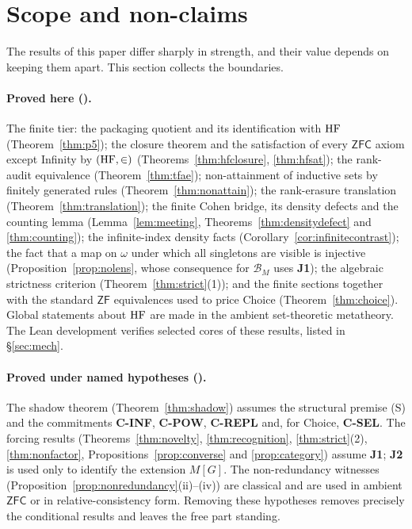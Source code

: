 \section{Scope and non-claims}\label{sec:scope}

The results of this paper differ sharply in strength, and their value depends on keeping them
apart. This section collects the boundaries.

\paragraph{Proved here (\inhouse).} The finite tier: the packaging quotient and its
identification with $\mathrm{HF}$ (Theorem~\ref{thm:p5}); the closure theorem and the satisfaction of
every $\mathsf{ZFC}$ axiom except Infinity by $(\mathrm{HF},\in)$ (Theorems~\ref{thm:hfclosure},
\ref{thm:hfsat}); the rank-audit equivalence (Theorem~\ref{thm:tfae}); non-attainment of
inductive sets by finitely generated rules (Theorem~\ref{thm:nonattain}); the rank-erasure
translation (Theorem~\ref{thm:translation}); the finite Cohen bridge, its density defects and the
counting lemma (Lemma~\ref{lem:meeting}, Theorems~\ref{thm:densitydefect} and \ref{thm:counting});
the infinite-index density facts (Corollary~\ref{cor:infinitecontrast}); the fact that a map on
$\omega$ under which all singletons are visible is injective (Proposition~\ref{prop:nolens}, whose
consequence for $\mathcal B_M$ uses \textbf{J1}); the algebraic strictness
criterion (Theorem~\ref{thm:strict}(1)); and the finite sections together with the standard
$\mathsf{ZF}$ equivalences used to price Choice (Theorem~\ref{thm:choice}). Global statements about
$\mathrm{HF}$ are made in the ambient set-theoretic metatheory. The Lean development verifies selected
cores of these results, listed in \S\ref{sec:mech}.

\paragraph{Proved under named hypotheses (\condg).} The shadow theorem
(Theorem~\ref{thm:shadow}) assumes the structural premise (S) and the commitments
\textbf{C-INF}, \textbf{C-POW}, \textbf{C-REPL} and, for Choice, \textbf{C-SEL}. The forcing
results (Theorems~\ref{thm:novelty}, \ref{thm:recognition}, \ref{thm:strict}(2),
\ref{thm:nonfactor}, Propositions~\ref{prop:converse} and \ref{prop:category}) assume \textbf{J1};
\textbf{J2} is used only to identify the extension $M[G]$. The non-redundancy witnesses
(Proposition~\ref{prop:nonredundancy}(ii)--(iv)) are classical and are used in ambient
$\mathsf{ZFC}$ or in relative-consistency form. Removing these hypotheses removes precisely the
conditional results and leaves the free part standing.

